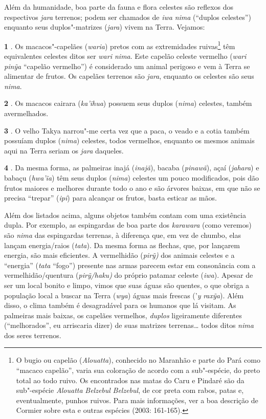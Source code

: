 Além da humanidade, boa parte da fauna e flora celestes são reflexos dos
respectivos \emph{jara} terrenos; podem ser chamados de \emph{iwa}
\emph{nima} (``duplos celestes'') enquanto seus duplos"-matrizes
(\emph{jara}) vivem na Terra. Vejamos:

\textbf{1} . Os macacos"-capelães (\emph{waria}) pretos com as
extremidades ruivas\footnote{O bugio ou capelão (\emph{Alouatta}),
  conhecido no Maranhão e parte do Pará como ``macaco capelão'', varia sua
  coloração de acordo com a sub"-espécie, do preto total ao todo ruivo.
  Os encontrados nas matas do Caru e Pindaré são da sub"-espécie
  \emph{Alouatta} \emph{Belzebul} \emph{Belzebul}, de cor preta com
  rabos, patas e, eventualmente, punhos ruivos. Para mais informações,
  ver a boa descrição de Cormier sobre esta e outras espécies (2003:
  161-165).} têm equivalentes celestes ditos ser \emph{wari nima}. Este
capelão celeste vermelho (\emph{wari} \emph{pinỹa} ``capelão vermelho'')
é considerado um animal perigoso e vem à Terra se alimentar de frutos.
Os capelães terrenos são \emph{jara}, enquanto os celestes são seus
\emph{nima}.

\textbf{2} . Os macacos cairara (\emph{ka'ihua}) possuem seus duplos
(\emph{nima}) celestes, também avermelhados.

\textbf{3} . O velho Takya narrou"-me certa vez que a paca, o veado e a
cotia também possuíam duplos (\emph{nima}) celestes, todos vermelhos,
enquanto os mesmos animais aqui na Terra seriam os \emph{jara} daqueles.

\textbf{4} . Da mesma forma, as palmeiras inajá (\emph{inajã}), bacaba
(\emph{pinawã}), açaí (\emph{jahara}) e babaçu (\emph{hwa'ĩa}) têm seus
duplos (\emph{nima}) celestes um pouco modificados, pois dão frutos
maiores e melhores durante todo o ano e são árvores baixas, em que não
se precisa ``trepar'' (\emph{ipi}) para alcançar os frutos, basta esticar
as mãos.

Além dos listados acima, alguns objetos também contam com uma existência
dupla. Por exemplo, as espingardas de boa parte dos \emph{karawara}
(como veremos) são \emph{nima} das espingardas terrenas, à diferença
que, em vez de chumbo, elas lançam energia/raios (\emph{tata}). Da mesma
forma as flechas, que, por lançarem energia, são mais eficientes. A
vermelhidão (\emph{pirỹ)} dos animais celestes e a ``energia''
(\emph{tata} ``fogo'') presente nas armas parecem estar em consonância com
a vermelhidão/quentura (\emph{pirỹ/haku)} do próprio patamar celeste
(\emph{iwa}). Apesar de ser um local bonito e limpo, vimos que suas
águas são quentes, o que obriga a população local a buscar na Terra
(\emph{wya}) águas mais frescas ('\emph{y} \emph{raxỹa}). Além disso, o
clima também é desagradável para os humanos que lá visitam. As palmeiras
mais baixas, os capelães vermelhos, \emph{duplos} ligeiramente
diferentes (``melhorados'', eu arriscaria dizer) de suas matrizes
terrenas\ldots{} todos ditos \emph{nima} dos seres terrenos.

